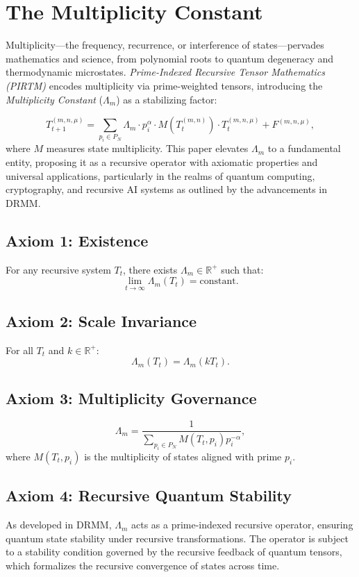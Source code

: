\documentclass{article}
\theoremstyle{plain}
\begin{document}
\section{ The Multiplicity Constant}

Multiplicity---the frequency, recurrence, or interference of states---pervades mathematics and science, from polynomial roots to quantum degeneracy and thermodynamic microstates. \textit{Prime-Indexed Recursive Tensor Mathematics (PIRTM)} encodes multiplicity via prime-weighted tensors, introducing the \textit{Multiplicity Constant} ($\Lambda_m$) as a stabilizing factor:

\[
T_{t+1}^{(m, n, \mu)} = \sum_{p_i \in P_N} \Lambda_m \cdot p_i^\alpha \cdot M(T_t^{(m, n)}) \cdot T_t^{(m, n, \mu)} + F^{(m, n, \mu)},
\]
where $M$ measures state multiplicity. This paper elevates $\Lambda_m$ to a fundamental entity, proposing it as a recursive operator with axiomatic properties and universal applications, particularly in the realms of quantum computing, cryptography, and recursive AI systems as outlined by the advancements in DRMM.

\subsection{Axiom 1: Existence}
For any recursive system $T_t$, there exists $\Lambda_m \in \mathbb{R}^+$ such that:
\[
\lim_{t \to \infty} \Lambda_m(T_t) = \text{constant}.
\]

\subsection{Axiom 2: Scale Invariance}
For all $T_t$ and $k \in \mathbb{R}^+$:
\[
\Lambda_m(T_t) = \Lambda_m(k T_t).
\]

\subsection{Axiom 3: Multiplicity Governance}
\[
\Lambda_m = \frac{1}{\sum_{p_i \in P_N} M(T_t, p_i) p_i^{-\alpha}},
\]
where $M(T_t, p_i)$ is the multiplicity of states aligned with prime $p_i$.

\subsection{Axiom 4: Recursive Quantum Stability}
As developed in DRMM, $\Lambda_m$ acts as a prime-indexed recursive operator, ensuring quantum state stability under recursive transformations. The operator is subject to a stability condition governed by the recursive feedback of quantum tensors, which formalizes the recursive convergence of states across time.
\end{document}
